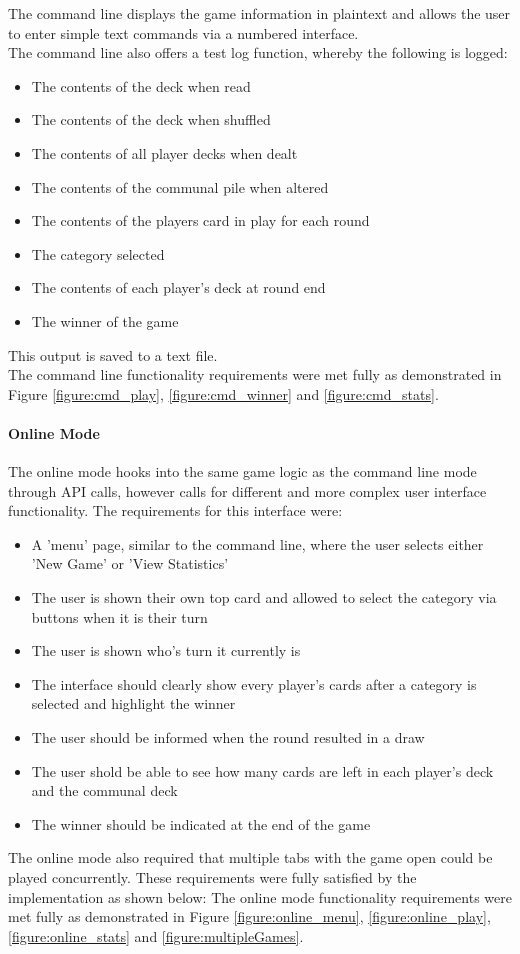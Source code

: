 The command line displays the game information in plaintext and allows the user to enter simple text commands via a numbered interface. \\

The command line also offers a test log function, whereby the following is logged:
\begin{itemize}
\item The contents of the deck when read
\item The contents of the deck when shuffled
\item The contents of all player decks when dealt
\item The contents of the communal pile when altered
\item The contents of the players card in play for each round
\item The category selected
\item The contents of each player's deck at round end
\item The winner of the game
\end{itemize}

This output is saved to a text file. \\

The command line functionality requirements were met fully as demonstrated in Figure \ref{figure:cmd_play}, \ref{figure:cmd_winner} and \ref{figure:cmd_stats}.

\paragraph{Online Mode}
The online mode hooks into the same game logic as the command line mode through API calls, however calls for different and more complex user interface functionality. The requirements for this interface were:
\begin{itemize}
\item A 'menu' page, similar to the command line, where the user selects either 'New Game' or 'View Statistics'
\item The user is shown their own top card and allowed to select the category via buttons when it is their turn
\item The user is shown who's turn it currently is
\item The interface should clearly show every player's cards after a category is selected and highlight the winner
\item The user should be informed when the round resulted in a draw
\item The user shold be able to see how many cards are left in each player's deck and the communal deck
\item The winner should be indicated at the end of the game
\end{itemize}

The online mode also required that multiple tabs with the game open could be played concurrently. 
These requirements were fully satisfied by the implementation as shown below:
The online mode functionality requirements were met fully as demonstrated in Figure \ref{figure:online_menu}, \ref{figure:online_play}, \ref{figure:online_stats} and \ref{figure:multipleGames}.


